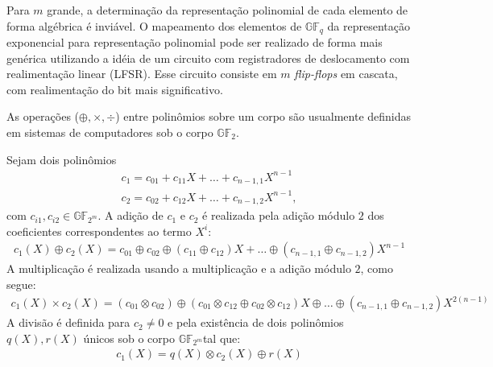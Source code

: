 Para $m$ grande, a determinação da representação polinomial de cada elemento de forma algébrica é inviável. O mapeamento dos elementos de $\mathbb{GF}_q$ da representação exponencial para representação polinomial pode ser realizado de forma mais genérica utilizando a idéia de um circuito com registradores de deslocamento com realimentação linear (LFSR). Esse circuito consiste em $m$ \emph{flip-flops} em cascata, com realimentação do bit mais significativo.

As operações ($\oplus, \times, \div$) entre polinômios sobre um corpo são usualmente definidas em sistemas de computadores sob o corpo $\mathbb{GF}_{2}$.

\begin{definition} Sejam dois polinômios
\begin{align*}
c_1=c_{01}+c_{11}X+ \ldots +c_{n-1,1}X^{n-1}\\
c_2=c_{02}+c_{12}X+ \ldots +c_{n-1,2}X^{n-1},
\end{align*}
com $c_{i1}, c_{i2} \in \mathbb{GF}_{2^m}$.
A adição de $c_1$ e $c_2$ é realizada pela adição módulo $2$ dos coeficientes correspondentes ao termo $X^i$:
\begin{align*}
c_1(X) \oplus c_2(X)=c_{01} \oplus c_{02} \oplus (c_{11} \oplus c_{12})X+ \ldots \oplus (c_{n-1,1} \oplus c_{n-1,2})X^{n-1}
\end{align*}
A multiplicação é realizada usando a multiplicação e a adição módulo $2$, como segue:
\begin{align*}
c_1(X) \times c_2(X)=(c_{01} \otimes c_{02}) \oplus (c_{01} \otimes c_{12} \oplus c_{02} \otimes c_{12})X \oplus  \ldots \oplus (c_{n-1,1} \oplus c_{n-1,2})X^{2(n-1)}
\end{align*}
A divisão é definida para $c_2 \neq 0$ e pela existência de dois polinômios $q(X), r(X)$ únicos sob o corpo $\mathbb{GF}_{2^m}$tal que:
\begin{align*}
c_1(X)=q(X) \otimes c_2(X) \oplus r(X)
\end{align*}
\end{definition}

